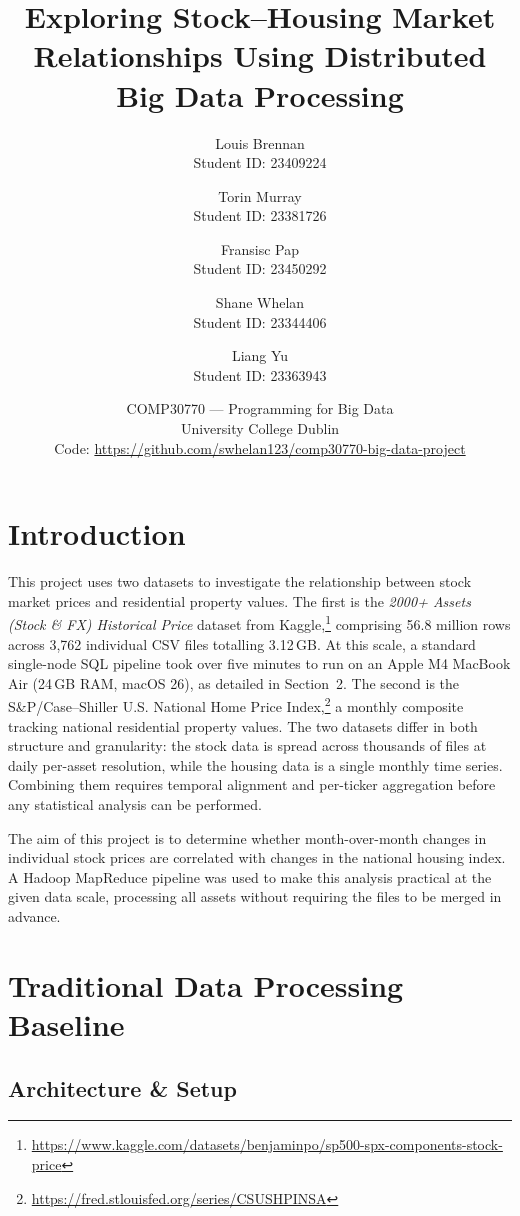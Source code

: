\documentclass[11pt]{article}
\title{\textbf{Exploring Stock--Housing Market Relationships Using Distributed Big Data Processing}}
\author{
  Louis Brennan \\{\small Student ID: 23409224}
  \and
  Torin Murray \\{\small Student ID: 23381726}
  \and
  Fransisc Pap \\{\small Student ID: 23450292}
  \and
  Shane Whelan \\{\small Student ID: 23344406}
  \and
  Liang Yu \\{\small Student ID: 23363943}
}
\date{
  COMP30770 --- Programming for Big Data \\
  University College Dublin \\
  \vspace{4pt}
  Code: \url{https://github.com/swhelan123/comp30770-big-data-project}
}
\begin{document}
\maketitle

\section{Introduction}

This project uses two datasets to investigate the relationship between stock market prices and residential property values. The first is the \textit{2000+ Assets (Stock \& FX) Historical Price} dataset from Kaggle,\footnote{\url{https://www.kaggle.com/datasets/benjaminpo/sp500-spx-components-stock-price}} comprising 56.8 million rows across 3,762 individual CSV files totalling 3.12\,GB. At this scale, a standard single-node SQL pipeline took over five minutes to run on an Apple M4 MacBook Air (24\,GB RAM, macOS 26), as detailed in Section~2. The second is the S\&P/Case--Shiller U.S. National Home Price Index,\footnote{\url{https://fred.stlouisfed.org/series/CSUSHPINSA}} a monthly composite tracking national residential property values. The two datasets differ in both structure and granularity: the stock data is spread across thousands of files at daily per-asset resolution, while the housing data is a single monthly time series. Combining them requires temporal alignment and per-ticker aggregation before any statistical analysis can be performed.

The aim of this project is to determine whether month-over-month changes in individual stock prices are correlated with changes in the national housing index. A Hadoop MapReduce pipeline was used to make this analysis practical at the given data scale, processing all assets without requiring the files to be merged in advance.

\section{Traditional Data Processing Baseline}

\subsection{Architecture \& Setup}
\end{document}
